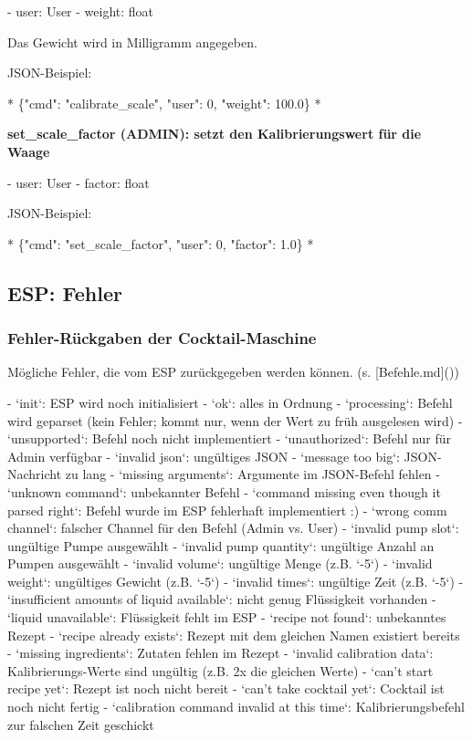 - user: User
- weight: float

Das Gewicht wird in Milligramm angegeben.

JSON-Beispiel:

*
\{"cmd": "calibrate\_scale", "user": 0, "weight": 100.0\}
*

\textbf{ set\_scale\_factor (ADMIN): setzt den Kalibrierungswert für die Waage}

- user: User
- factor: float

JSON-Beispiel:

*
\{"cmd": "set\_scale\_factor", "user": 0, "factor": 1.0\}
*

\subsection{ESP: Fehler}
\subsubsection{ Fehler-Rückgaben der Cocktail-Maschine}

Mögliche Fehler, die vom ESP zurückgegeben werden können. (s. [Befehle.md]())

- `init`: ESP wird noch initialisiert
- `ok`: alles in Ordnung
- `processing`: Befehl wird geparset (kein Fehler; kommt nur, wenn der Wert zu früh ausgelesen wird)
- `unsupported`: Befehl noch nicht implementiert
- `unauthorized`: Befehl nur für Admin verfügbar
- `invalid json`: ungültiges JSON
- `message too big`: JSON-Nachricht zu lang
- `missing arguments`: Argumente im JSON-Befehl fehlen
- `unknown command`: unbekannter Befehl
- `command missing even though it parsed right`: Befehl wurde im ESP fehlerhaft implementiert :)
- `wrong comm channel`: falscher Channel für den Befehl (Admin vs. User)
- `invalid pump slot`: ungültige Pumpe ausgewählt
- `invalid pump quantity`: ungültige Anzahl an Pumpen ausgewählt
- `invalid volume`: ungültige Menge (z.B. `-5`)
- `invalid weight`: ungültiges Gewicht (z.B. `-5`)
- `invalid times`: ungültige Zeit (z.B. `-5`)
- `insufficient amounts of liquid available`: nicht genug Flüssigkeit vorhanden
- `liquid unavailable`: Flüssigkeit fehlt im ESP
- `recipe not found`: unbekanntes Rezept
- `recipe already exists`: Rezept mit dem gleichen Namen existiert bereits
- `missing ingredients`: Zutaten fehlen im Rezept
- `invalid calibration data`: Kalibrierungs-Werte sind ungültig (z.B. 2x die gleichen Werte)
- `can't start recipe yet`: Rezept ist noch nicht bereit
- `can't take cocktail yet`: Cocktail ist noch nicht fertig
- `calibration command invalid at this time`: Kalibrierungsbefehl zur falschen Zeit geschickt


